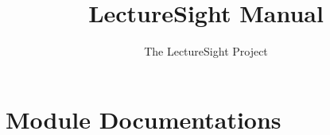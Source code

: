 \documentclass[a4paper,10pt]{book}
\begin{document}
\author{The LectureSight Project}
\title{LectureSight Manual}

\frontmatter
\tableofcontents

\mainmatter

\chapter{Module Documentations}

\backmatter
%
%
% 
% 
\end{document}
